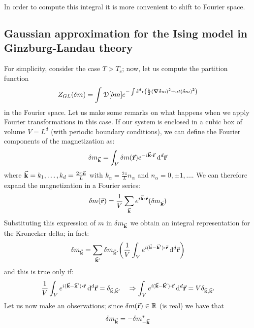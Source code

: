 \documentclass[../main/main.tex]{subfiles}
\begin{document}
In order to compute this integral it is more convenient to shift to Fourier space.




\subsection{Gaussian approximation for the Ising model in Ginzburg-Landau theory}
For simplicity, consider the case \( T>T_c \); now, let us compute the partition function
\begin{equation}
  Z_{GL} (\delta m) = \int_{}^{} \mathcal{D} \qty[\delta m] e^{- \int_{}^{} \dd[d]{r} \qty(\frac{k}{2} \qty(\grad \delta m)^2 + a t (\delta m)^2  )  }
 \end{equation}
 in the Fourier space.
 Let us make some remarks on what happens when we apply Fourier transformations in this case. If our system is enclosed in a cubic box of volume \( V = L^d \) (with periodic boundary conditions), we can define the Fourier components of the magnetization as:
 \begin{equation}
   \delta m_{\va{k}} = \int_{V}^{}  \delta m (\va{r}) e^{-i \va{k} \vdot \va{r} }\dd[d]{\va{r}}
 \end{equation}
 where \( \va{k} = k_1, \dots, k_d = \frac{2 \pi  \va{n} }{L}\) with \( k_ \alpha = \frac{2 \pi }{L} n_ \alpha  \) and \( n_ \alpha  = 0 , \pm 1, \dots \). We can therefore expand the magnetization in a Fourier series:
 \begin{equation}
   \delta m (\va{r}) = \frac{1}{V} \sum_{\va{k}}  e^{i \va{k}\vdot \va{r}} (\delta m_{\va{k}})
 \end{equation}
 Substituting this expression of \( m \) in \( \delta m_{\va{k}} \) we obtain an integral representation for the Kronecker delta; in fact:
 \begin{equation*}
   \delta m_{\va{k}} = \sum_{\va{k}'}^{}  \delta m_{\va{k}'} \qty( \frac{1}{V} \int_{V}^{} e^{i(\va{k}-\va{k}')\vdot \va{r}} \dd[d]{\va{r}}  )
 \end{equation*}
and this is true only if:
\begin{equation*}
  \frac{1}{V} \int_{V}^{} e^{i(\va{k}-\va{k}')\vdot \va{r}} \dd[d]{\va{r}} = \delta _{\va{k},\va{k}'} \quad \Rightarrow   \int_{V}^{} e^{i(\va{k}-\va{k}')\vdot \va{r}} \dd[d]{\va{r}} = V \delta _{\va{k},\va{k}'}
\end{equation*}
Let us now make an observations; since \( \delta m (\va{r}) \in \mathbb{R} \) (is real) we have that
\begin{equation*}
  \delta m_{\va{k}} = - \delta m^*_{-\va{k}}
\end{equation*}
\end{document}
